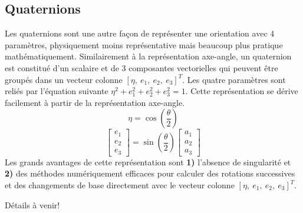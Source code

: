 \subsection{Quaternions}
\label{sec:quaternions}
Les quaternions sont une autre façon de représenter une orientation avec 4 paramètres, physiquement moins représentative mais beaucoup plus pratique mathématiquement. Similairement à la représentation axe-angle, un quaternion est constitué d'un scalaire et de 3 composantes vectorielles qui peuvent être groupés dans un vecteur colonne $[\eta,\ e_{1},\ e_{2},\ e_{3}]^T$. Les quatre paramètres sont reliés par l'équation suivante $\eta^2+e_{1}^2+e_{2}^2+e_{3}^2=1$. Cette représentation se dérive facilement à partir de la représentation axe-angle.
\begin{equation}
\eta=\cos\left(\frac{\theta}{2}\right)
\end{equation}
\begin{equation}
\left[ \begin{array}{c} e_{1} \\ e_{2} \\ e_{3} \end{array}
\right]
=\sin\left(\frac{\theta}{2}\right) \left[ \begin{array}{c} a_{1} \\ a_{2} \\ a_{3} \end{array}
\right]
\end{equation}
Les grands avantages de cette représentation sont \textbf{1)} l'absence de singularité et \textbf{2)} des méthodes numériquement efficaces pour calculer des rotations successives et des changements de base directement avec le vecteur colonne $[\eta,\ e_{1},\ e_{2},\ e_{3}]^T$. 

Détails à venir!







